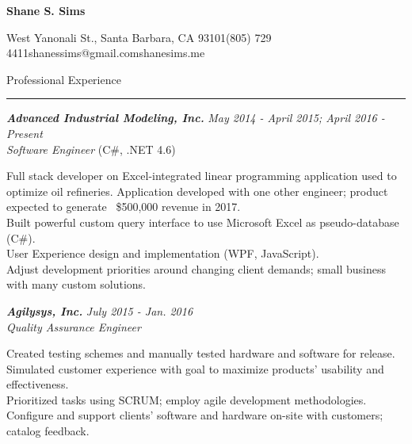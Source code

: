 \documentclass[10pt]{article}
\newcommand{\simsbullet}{{\raisebox{2pt}{\tiny $\bullet$}}\hspace{8pt}}
\newcommand{\midlinesimsbullet}{\hspace{4pt}{\raisebox{2pt}{\tiny $\bullet$}}\hspace{5pt}}
\begin{document}

{\centerline{\huge\bf Shane S. Sims}}
\vskip 8pt
{\centerline{ West Yanonali St., Santa Barbara, CA 93101{\midlinesimsbullet}(805) 729 4411{\midlinesimsbullet}shanessims@gmail.com{\midlinesimsbullet}shanesims.me}}

\vskip 14pt




{\Large Professional Experience}
\vskip 2pt
\hrule
\vskip 6pt

{\bfseries\itshape\sffamily Advanced Industrial Modeling, Inc.} \hfill \textsf{\textit{May 2014 - April 2015; April 2016 - Present}} \\
\textit{\textsf{Software Engineer}} (C\#, .NET 4.6)
\vskip 4pt

\setlength{\leftskip}{16pt}

Full stack developer on Excel-integrated linear programming application used to optimize oil refineries. 
\vskip 4pt
\simsbullet Application developed with one other engineer; product expected to generate ~\$500,000 revenue in 2017. \\
\simsbullet Built powerful custom query interface to use Microsoft Excel as pseudo-database (C\#). \\
\simsbullet User Experience design and implementation (WPF, JavaScript). \\
\simsbullet Adjust development priorities around changing client demands; small business with many custom solutions. 

\setlength{\leftskip}{0pt}

\vskip 8pt

{\bfseries\itshape\sffamily Agilysys, Inc.} \hfill \textsf{\textit{July 2015 - Jan. 2016}} \\
\textit{\textsf{Quality Assurance Engineer}}
\vskip 4pt

\setlength{\leftskip}{16pt}

Created testing schemes and manually tested hardware and software for release.
\vskip 4pt
\simsbullet Simulated customer experience with goal to maximize products' usability and effectiveness. \\
\simsbullet Prioritized tasks using SCRUM; employ agile development methodologies. \\
\simsbullet Configure and support clients' software and hardware on-site with customers; catalog feedback.
\end{document}
